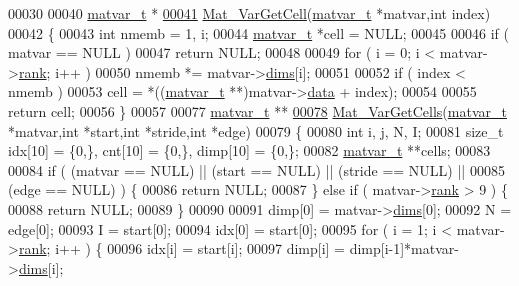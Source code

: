 \begin{DoxyCode}
00030 
00040 \hyperlink{group___m_a_t_structmatvar__t}{matvar\_t} *
\hyperlink{group___m_a_t_gac1e15063439c0bd3eb0c986514c742dc}{00041} \hyperlink{group___m_a_t_gac1e15063439c0bd3eb0c986514c742dc}{Mat\_VarGetCell}(\hyperlink{group___m_a_t_structmatvar__t}{matvar\_t} *matvar,\textcolor{keywordtype}{int} index)
00042 \{
00043     \textcolor{keywordtype}{int}       nmemb = 1, i;
00044     \hyperlink{group___m_a_t_structmatvar__t}{matvar\_t} *cell = NULL;
00045 
00046     \textcolor{keywordflow}{if} ( matvar == NULL )
00047         \textcolor{keywordflow}{return} NULL;
00048 
00049     \textcolor{keywordflow}{for} ( i = 0; i < matvar->\hyperlink{group___m_a_t_a84ba70c96ded13cc555fa75b768d9921}{rank}; i++ )
00050         nmemb *= matvar->\hyperlink{group___m_a_t_a8e01234e1c862ce3472bb37f5a09b92c}{dims}[i];
00051 
00052     if ( index < nmemb )
00053         cell = *((\hyperlink{group___m_a_t_structmatvar__t}{matvar\_t} **)matvar->\hyperlink{group___m_a_t_a5672978efa230bbdecdf38ede781f7fa}{data} + index);
00054 
00055     \textcolor{keywordflow}{return} cell;
00056 \}
00057 
00077 \hyperlink{group___m_a_t_structmatvar__t}{matvar\_t} **
\hyperlink{group___m_a_t_ga0732b0a6c40975b036068b9a14422d45}{00078} \hyperlink{group___m_a_t_ga0732b0a6c40975b036068b9a14422d45}{Mat\_VarGetCells}(\hyperlink{group___m_a_t_structmatvar__t}{matvar\_t} *matvar,\textcolor{keywordtype}{int} *start,\textcolor{keywordtype}{int} *stride,\textcolor{keywordtype}{int} *edge)
00079 \{
00080     \textcolor{keywordtype}{int} i, j, N, I;
00081     \textcolor{keywordtype}{size\_t} idx[10] = \{0,\}, cnt[10] = \{0,\}, dimp[10] = \{0,\};
00082     \hyperlink{group___m_a_t_structmatvar__t}{matvar\_t} **cells;
00083 
00084     \textcolor{keywordflow}{if} ( (matvar == NULL) || (start == NULL) || (stride == NULL) ||
00085         (edge == NULL) ) \{
00086         \textcolor{keywordflow}{return} NULL;
00087     \} \textcolor{keywordflow}{else} \textcolor{keywordflow}{if} ( matvar->\hyperlink{group___m_a_t_a84ba70c96ded13cc555fa75b768d9921}{rank} > 9 ) \{
00088         \textcolor{keywordflow}{return} NULL;
00089     \}
00090 
00091     dimp[0] = matvar->\hyperlink{group___m_a_t_a8e01234e1c862ce3472bb37f5a09b92c}{dims}[0];
00092     N = edge[0];
00093     I = start[0];
00094     idx[0] = start[0];
00095     \textcolor{keywordflow}{for} ( i = 1; i < matvar->\hyperlink{group___m_a_t_a84ba70c96ded13cc555fa75b768d9921}{rank}; i++ ) \{
00096         idx[i]  = start[i];
00097         dimp[i] = dimp[i-1]*matvar->\hyperlink{group___m_a_t_a8e01234e1c862ce3472bb37f5a09b92c}{dims}[i];

\end{DoxyCode}
